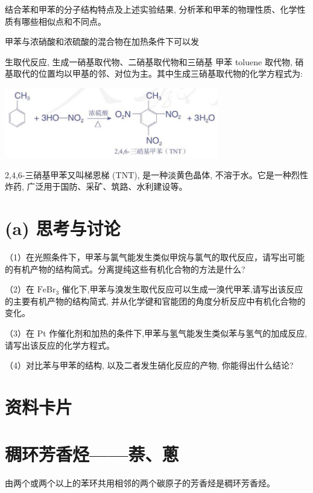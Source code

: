 \documentclass[10pt]{article}
\begin{document}
结合苯和甲苯的分子结构特点及上述实验结果, 分析苯和甲苯的物理性质、化学性质有哪些相似点和不同点。

甲苯与浓硝酸和浓硫酸的混合物在加热条件下可以发

生取代反应, 生成一硝基取代物、二硝基取代物和三硝基 甲苯 toluene 取代物, 硝基取代的位置均以甲基的邻、对位为主。其中生成三硝基取代物的化学方程式为:

\begin{center}
\includegraphics[max width=0.7\textwidth]{images/0190efc5-b58a-7c43-bfb0-e0a030df9cfd_52_134532.jpg}
\end{center}

2,4,6-三硝基甲苯又叫梯恩梯 (TNT), 是一种淡黄色晶体, 不溶于水。它是一种烈性炸药, 广泛用于国防、采矿、筑路、水利建设等。

\section*{(a) 思考与讨论}

（1）在光照条件下，甲苯与氯气能发生类似甲烷与氯气的取代反应，请写出可能的有机产物的结构简式。分离提纯这些有机化合物的方法是什么?

（2）在 \({\mathrm{{FeBr}}}_{3}\) 催化下,甲苯与溴发生取代反应可以生成一溴代甲苯,请写出该反应的主要有机产物的结构简式, 并从化学键和官能团的角度分析反应中有机化合物的变化。

（3）在 \(\mathrm{{Pt}}\) 作催化剂和加热的条件下,甲苯与氢气能发生类似苯与氢气的加成反应, 请写出该反应的化学方程式。

（4）对比苯与甲苯的结构, 以及二者发生硝化反应的产物, 你能得出什么结论?

\section*{资料卡片}

\section*{稠环芳香烃——萘、蔥}

由两个或两个以上的苯环共用相邻的两个碳原子的芳香烃是稠环芳香烃。
\end{document}
